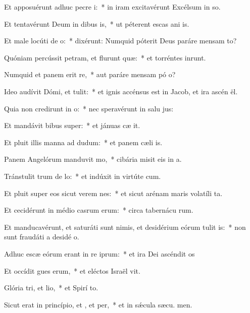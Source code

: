 \item Et apposuérunt adhuc pecre i:~* in iram excitavérunt Excélsum in so.
\item Et tentavérunt Deum in dibus is,~* ut péterent escas ani is.
\item Et male locúti  de o:~* dixérunt: Numquid póterit Deus paráre mensam  to?
\item Quóniam percússit petram, et flurunt quæ:~* et torréntes inrunt.
\item Numquid et panem erit re,~* aut paráre mensam pó o?
\item Ideo audívit Dómi, et tulit:~* et ignis accénsus est in Jacob, et ira ascén  ël.
\item Quia non credirunt in o:~* nec speravérunt in salu jus:
\item Et mandávit bibus super:~* et jánuas cæ it.
\item Et pluit illis manna ad dudum:~* et panem cæli  is.
\item Panem Angelórum manduvit mo,~* cibária misit eis in a.
\item Tránstulit trum de lo:~* et indúxit in virtúte  cum.
\item Et pluit super eos sicut verem nes:~* et sicut arénam maris volatíli ta.
\item Et cecidérunt in médio casrum erum:~* circa tabernácu rum.
\item Et manducavérunt, et saturáti sunt nimis, et desidérium eórum tulit is:~* non sunt fraudáti a desidé o.
\item Adhuc escæ eórum erant in re iprum:~* et ira Dei ascéndit  os
\item Et occídit gues erum,~* et eléctos Israël vit.
\item Glória tri, et lio,~* et Spirí to.
\item Sicut erat in princípio, et , et per,~* et in sǽcula sæcu. men.
